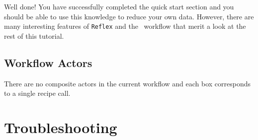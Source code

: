 \documentclass[pdftex,a4paper,twoside,11pt]{article}
\begin{document}
Well done! You have successfully completed the quick start section and
you should be able to use this knowledge to reduce your own
data. However, there are many interesting features of {\tt Reflex} and
the \instname\, workflow that merit a look at the rest of this tutorial.







\subsection{Workflow Actors}

There are no composite actors in the current workflow
and each box corresponds to a single recipe call.






\section{Troubleshooting}
\end{document}
